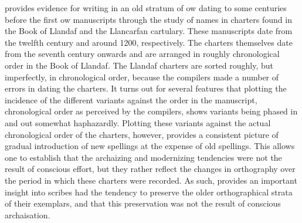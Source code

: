 \Textcite{Sim_emergenceOld91} provides evidence for writing in an old stratum of \gls{ow} dating to some centuries before the first \gls{ow}  manuscripts through the study of names in charters found in the Book of Llandaf and the Llancarfan cartulary. These manuscripts date from the twelfth century and around 1200, respectively. The charters themselves date from the seventh century onwards and are arranged in roughly chronological order in the Book of Llandaf. 
The Llandaf charters are sorted  roughly, but imperfectly, in chronological order, because the compilers made a number of errors in dating the charters.  It turns out for several features that plotting the incidence of the different variants against the order in the manuscript, \ie chronological order as perceived by the compilers, shows variants being phased in and out somewhat haphazardly. Plotting these variants against the actual chronological order of the charters, however, provides a consistent picture of gradual introduction of new spellings at the expense of old spellings. This allows one to establish that the archaizing and modernizing tendencies were not the result of conscious effort, but they rather reflect the changes in orthography over the period in which these charters were recorded. As such, \textcite{Sim_emergenceOld91} provides an important insight into scribes had the tendency to preserve the older orthographical strata of their exemplars, and that this preservation was not the result of conscious archaisation.

